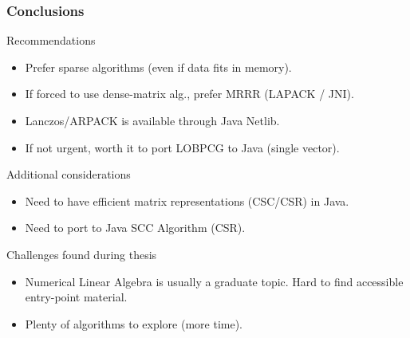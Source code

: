  \begin{frame}
  \frametitle{Conclusions}
  \begin{block}{Recommendations}
    \begin{itemize}
    \item Prefer sparse algorithms (even if data fits in memory).
    \item If forced to use dense-matrix alg., prefer MRRR (LAPACK / JNI).
    \item Lanczos/ARPACK is available through Java Netlib.
    \item If not urgent, worth it to port LOBPCG to Java (single vector).
    \end{itemize}
  \end{block}
  \begin{block}{Additional considerations}
    \begin{itemize}
    \item Need to have efficient matrix representations (CSC/CSR) in Java.
    \item Need to port to Java SCC Algorithm (CSR).
    \end{itemize}
  \end{block}
  \begin{block}{Challenges found during thesis}
    \begin{itemize}
    \item Numerical Linear Algebra is usually a graduate topic. Hard to find accessible entry-point material.
    \item Plenty of algorithms to explore (more time).
    \end{itemize}
  \end{block}  
\end{frame}
